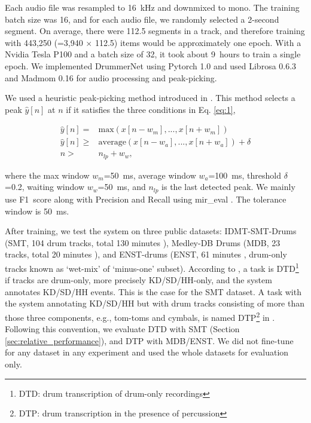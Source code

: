 \documentclass{article}
\newcommand{\squeeze}{\vspace{-0.15cm}}
\newcommand{\smallsqueeze}{\vspace{-0.1cm}}
\begin{document}
	Each audio file was resampled to 16~kHz and downmixed to mono. The training batch size was 16, and for each audio file, we randomly selected a 2-second segment. On average, there were 112.5 segments in a track, and therefore training with 443,250 (=3,940 $\times$ 112.5) items would be approximately one epoch. With a Nvidia Tesla P100 and a batch size of 32, it took about 9~hours to train a single epoch. We implemented DrummerNet using Pytorch 1.0 \cite{paszke2017automatic} and used  Librosa 0.6.3 \cite{brian_mcfee_2019_2564164} and Madmom 0.16 \cite{madmom} for audio processing and peak-picking.
	
	We used a heuristic peak-picking method introduced in \cite{bock2012evaluating}. This method selects a peak $\hat{y}[n]$ at $n$ if it satisfies the three conditions in Eq. \eqref{eq:1},
	
	\squeeze
	\smallsqueeze
	\begin{equation} \label{eq:1}
		\begin{aligned} 
			\hat{y}[n] =& \text{max}(x[n-w_m],...,x[n+w_m]) \\
			\hat{y}[n] \geq& \text{average}(x[n-w_a],...,x[n+w_a]) + \delta \\
			n >& n_{lp} + w_w, 
		\end{aligned}
	\end{equation}
	
	where the max window $w_m$=50~ms, average window $w_a$=100~ms, threshold $\delta$=0.2, waiting window $w_w$=50~ms, and $n_{lp}$ is the last detected peak. We mainly use F1~score along with Precision and Recall using mir\_eval \cite{Raffel14mir_eval}. The tolerance window is 50~ms.
	
	After training, we test the system on three public datasets: IDMT-SMT-Drums (SMT, 104 drum tracks, total 130 minutes  \cite{dittmar2014real}), Medley-DB Drums (MDB, 23 tracks, total 20 minutes \cite{southall2017mdb}), and ENST-drums (ENST, 61 minutes \cite{gillet2006enst}, drum-only tracks known as `wet-mix' of `minus-one' subset). According to \cite{wu2018review}, a task is DTD\footnote{DTD: drum transcription of drum-only recordings} if tracks are drum-only, more precisely KD/SD/HH-only, and the system annotates KD/SD/HH events. This is the case for the SMT dataset. A task with the system annotating KD/SD/HH but with drum tracks consisting of more than those three components, e.g., tom-toms and cymbals, is named DTP\footnote{DTP: drum transcription in the presence of percussion} in \cite{wu2018review}. Following this convention, we evaluate DTD with SMT (Section \ref{sec:relative_performance}), and DTP with MDB/ENST. We did not fine-tune for any dataset in any experiment and used the whole datasets for evaluation only.
	
\end{document}
